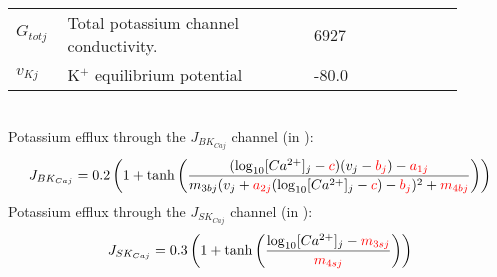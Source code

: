 \documentclass[fleqn]{report}
\numberwithin{equation}{section}
\numberwithin{equation}{section}
\begin{document}
							\begin{table}[h!]
							\centering
							\begin{tabular}{ p{0.09\linewidth}  >{\footnotesize} p{0.5\linewidth}  >{\footnotesize} p{0.27\linewidth} >{\footnotesize} p{0.03\linewidth} }
							\hline
							$G_{totj}$      		& Total potassium channel conductivity.						 		& 6927 \pS		& \cite{Koenigsberger2006} \\
							$v_{Kj}$      			& K$^{+}$ equilibrium potential					 			 		& -80.0 \mV		& \cite{Koenigsberger2006} \\
							\hline
							\end{tabular}
							\label{tab:JKj}
							\end{table}
							\\
							Potassium efflux through the $J_{BK_{Caj}}$ channel (in \uMs):
							\begin{equation} \label{eq:JBKCAj}
							J_{BK_{Caj}} = 0.2 \left(   1+ \mathrm{tanh}   \left(   \frac{   (\mathrm{log}_{10} [Ca^{2+}]_{j} - \textcolor{red}{c}) (v_{j}-\textcolor{red}{b_{j}}) - \textcolor{red}{a_{1j}}  }   { m_{3bj} ( v_{j} + \textcolor{red}{a_{2j}} (\mathrm{log}_{10} [Ca^{2+}]_{j} -\textcolor{red}{c} )-\textcolor{red}{b_{j}} )^{2} + \textcolor{red}{m_{4bj}} }  \right)     \right)  
							\end{equation}
							Potassium efflux through the $J_{SK_{Caj}}$ channel (in \uMs):
							\begin{equation} \label{eq:JSKCaj}
							J_{SK_{Caj}} = 0.3\left( 1+ \mathrm{tanh}  \left(  \frac{   \mathrm{log}_{10} [Ca^{2+}]_{j} -\textcolor{red}{m_{3sj}}  } {\textcolor{red}{m_{4sj}}}  \right)      \right) 
							\end{equation}
\end{document}
